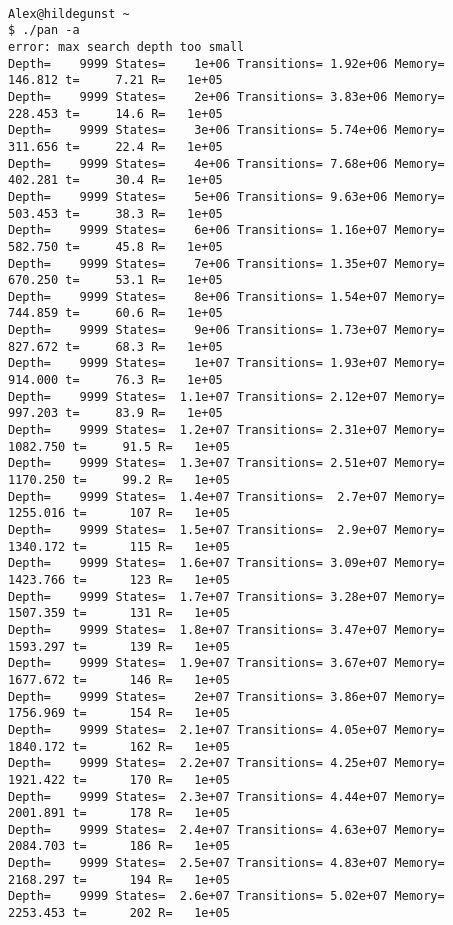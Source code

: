 \documentclass{llncs}
\begin{document}
\begin{lstlisting}[frame=single]

Alex@hildegunst ~
$ ./pan -a
error: max search depth too small
Depth=    9999 States=    1e+06 Transitions= 1.92e+06 Memory=   146.812 t=     7.21 R=   1e+05
Depth=    9999 States=    2e+06 Transitions= 3.83e+06 Memory=   228.453 t=     14.6 R=   1e+05
Depth=    9999 States=    3e+06 Transitions= 5.74e+06 Memory=   311.656 t=     22.4 R=   1e+05
Depth=    9999 States=    4e+06 Transitions= 7.68e+06 Memory=   402.281 t=     30.4 R=   1e+05
Depth=    9999 States=    5e+06 Transitions= 9.63e+06 Memory=   503.453 t=     38.3 R=   1e+05
Depth=    9999 States=    6e+06 Transitions= 1.16e+07 Memory=   582.750 t=     45.8 R=   1e+05
Depth=    9999 States=    7e+06 Transitions= 1.35e+07 Memory=   670.250 t=     53.1 R=   1e+05
Depth=    9999 States=    8e+06 Transitions= 1.54e+07 Memory=   744.859 t=     60.6 R=   1e+05
Depth=    9999 States=    9e+06 Transitions= 1.73e+07 Memory=   827.672 t=     68.3 R=   1e+05
Depth=    9999 States=    1e+07 Transitions= 1.93e+07 Memory=   914.000 t=     76.3 R=   1e+05
Depth=    9999 States=  1.1e+07 Transitions= 2.12e+07 Memory=   997.203 t=     83.9 R=   1e+05
Depth=    9999 States=  1.2e+07 Transitions= 2.31e+07 Memory=  1082.750 t=     91.5 R=   1e+05
Depth=    9999 States=  1.3e+07 Transitions= 2.51e+07 Memory=  1170.250 t=     99.2 R=   1e+05
Depth=    9999 States=  1.4e+07 Transitions=  2.7e+07 Memory=  1255.016 t=      107 R=   1e+05
Depth=    9999 States=  1.5e+07 Transitions=  2.9e+07 Memory=  1340.172 t=      115 R=   1e+05
Depth=    9999 States=  1.6e+07 Transitions= 3.09e+07 Memory=  1423.766 t=      123 R=   1e+05
Depth=    9999 States=  1.7e+07 Transitions= 3.28e+07 Memory=  1507.359 t=      131 R=   1e+05
Depth=    9999 States=  1.8e+07 Transitions= 3.47e+07 Memory=  1593.297 t=      139 R=   1e+05
Depth=    9999 States=  1.9e+07 Transitions= 3.67e+07 Memory=  1677.672 t=      146 R=   1e+05
Depth=    9999 States=    2e+07 Transitions= 3.86e+07 Memory=  1756.969 t=      154 R=   1e+05
Depth=    9999 States=  2.1e+07 Transitions= 4.05e+07 Memory=  1840.172 t=      162 R=   1e+05
Depth=    9999 States=  2.2e+07 Transitions= 4.25e+07 Memory=  1921.422 t=      170 R=   1e+05
Depth=    9999 States=  2.3e+07 Transitions= 4.44e+07 Memory=  2001.891 t=      178 R=   1e+05
Depth=    9999 States=  2.4e+07 Transitions= 4.63e+07 Memory=  2084.703 t=      186 R=   1e+05
Depth=    9999 States=  2.5e+07 Transitions= 4.83e+07 Memory=  2168.297 t=      194 R=   1e+05
Depth=    9999 States=  2.6e+07 Transitions= 5.02e+07 Memory=  2253.453 t=      202 R=   1e+05

\end{lstlisting}
\end{document}

